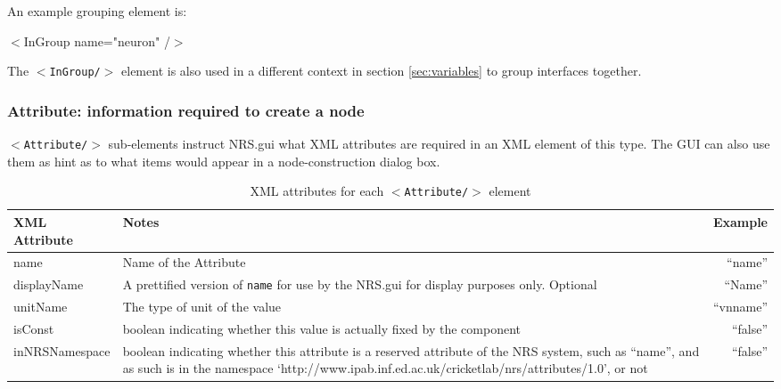 \documentclass[pdftex,a4paper]{article}
\newcommand{\XML}[2][]{{\tt \small $<$#2#1/$>$}}
\newcommand{\XMLfont}[1]{{\tt \small #1}}
\newcommand{\XMLtext}[1]{
  \begin{tt}
    \begin{small}
      \begin{list}{}{
          \setlength{\topsep}{0pt}
          \setlength{\partopsep}{0pt}
          \setlength{\itemsep}{0pt}
          \setlength{\parsep}{0pt}
          \setlength{\leftmargin}{2em}
          \setlength{\rightmargin}{2em}
          \setlength{\labelsep}{0pt}
        }
      \item #1
      \end{list}
    \end{small}
  \end{tt}
}
\newcommand{\XMLsimple}[2][]{\XMLtext{$<$#2#1/$>$}}
\begin{document}
An example grouping element is:

\XMLsimple[ name="neuron" ]{InGroup}

The \XML{InGroup} element is also used in a different context in
section \ref{sec:variables} to group interfaces together.

\subsubsection{Attribute: information required to create a node}

\XML{Attribute} sub-elements instruct NRS.gui what XML attributes are
required in an XML element of this type. The GUI can also use them as
hint as to what items would appear in a node-construction dialog box.


\begin{table}[!h]
  \begin{center}
    \caption{XML attributes for each \XML{Attribute} element}
    \label{attributes}
    \begin{tabular}{|l|p{6cm}|r|}
      \hline

      \textbf{XML Attribute} & \textbf{Notes} & \textbf{Example}\\

      \hline

      name & Name of the Attribute & ``name''\\

      \hline

      displayName & A prettified version of \XMLfont{name} for use by
      the NRS.gui for display purposes only. Optional & ``Name'' \\

      \hline

      unitName & The type of unit of the value & ``vnname''  \\

      \hline

      isConst & boolean indicating whether this value is actually
      fixed by the component & ``false'' \\

      \hline

      inNRSNamespace & boolean indicating whether this attribute is a
      reserved attribute of the NRS system, such as ``name'', and as
      such is in the namespace
      `http://www.ipab.inf.ed.ac.uk/cricketlab/nrs/attributes/1.0', or
      not & ``false'' \\


\end{tabular}
\end{center}
\end{table}
\end{document}
